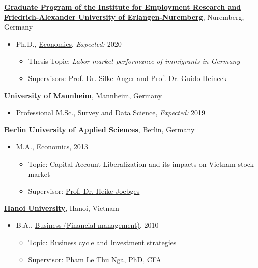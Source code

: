 \documentclass[10pt]{article}
\newenvironment{outerlist}[1][\enskip\textbullet]%
        {\begin{itemize}[#1,leftmargin=*]}{\end{itemize}%
         \vspace{-.6\baselineskip}}
\newenvironment{innerlist}[1][\enskip\textbullet]%
        {\begin{itemize}[#1,leftmargin=*,parsep=0pt,itemsep=0pt,topsep=0pt,partopsep=0pt]}
        {\end{itemize}}
\begin{document}
\href{http://www.iab.de/en/ueberblick/graduiertenprogramm.aspx}{\textbf{Graduate Program of the Institute for Employment Research and Friedrich-Alexander University of Erlangen-Nuremberg}},
Nuremberg, Germany
\begin{outerlist}

\item[] Ph.D.,
        \href{http://www.iab.de/en/ueberblick/graduiertenprogramm/promovieren.aspx}
             {Economics},
             \emph{Expected:}  2020
        \begin{innerlist}
        \item Thesis Topic: \emph{Labor market performance of immigrants in Germany}
        \item Supervisors:
              \href{http://www.iab.de/754/section.aspx/Mitarbeiter/4859330}
                   {Prof. Dr. Silke Anger} and
              \href{https://www.uni-bamberg.de/vwl-mikro/team/heineck/}
                   {Prof. Dr. Guido Heineck}
        \end{innerlist}
\end{outerlist}

\vspace{.1in}
\href{https://survey-data-science.net/}{\textbf{University of Mannheim}},
Mannheim, Germany
\begin{outerlist}
\item[] Professional M.Sc., {Survey and Data Science},
		\emph{Expected:} 2019
\end{outerlist}

\vspace{.1in}
\href{http://mide.htw-berlin.de/}{\textbf{Berlin University of Applied Sciences}},
Berlin, Germany
\begin{outerlist}
\item[] M.A., {Economics}, 2013
        \begin{innerlist}
        \item Topic: Capital Account Liberalization and its impacts on Vietnam stock market
        \item Supervisor:
              \href{https://www.htw-berlin.de/hochschule/personen/person/?eid=4647}
                    {Prof. Dr. Heike Joebges}
        \end{innerlist}
\end{outerlist}

\vspace{.1in}
\href{http://internationaloffice.hanu.vn/}{\textbf{Hanoi University}},
Hanoi, Vietnam
\begin{outerlist}
\item[] B.A.,
        \href{http://fmt.hanu.vn/en/mod/page/view.php?id=13}
             {Business (Financial management)}, 2010
        \begin{innerlist}
        \item Topic: Business cycle and Investment strategies
        \item Supervisor:
              \href{https://www.linkedin.com/in/pham-le-thu-nga-cfa-180a2b11/}
                   {Pham Le Thu Nga, PhD, CFA}
        \end{innerlist}
\end{outerlist}
\end{document}
